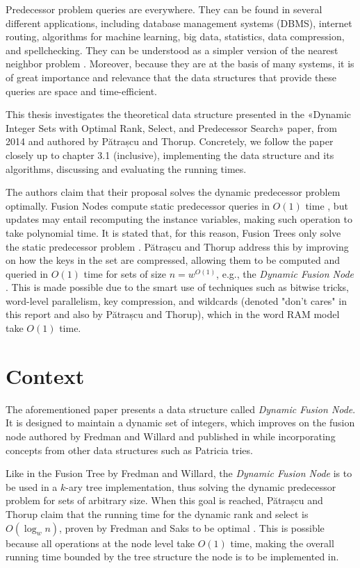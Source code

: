 Predecessor problem queries are everywhere. They can be found in several different applications, including database management systems (DBMS), internet routing, algorithms for machine learning, big data, statistics, data compression, and spellchecking. They can be understood as a simpler version of the nearest neighbor problem \cite{bille2020massive}. Moreover, because they are at the basis of many systems, it is of great importance and relevance that the data structures that provide these queries are space and time-efficient.

This thesis investigates the theoretical data structure presented in the «Dynamic Integer Sets with Optimal Rank, Select, and Predecessor Search» paper, from 2014 and authored by Pătrașcu and Thorup. Concretely, we follow the paper closely up to chapter 3.1 (inclusive), implementing the data structure and its algorithms, discussing and evaluating the running times.

The authors claim that their proposal solves the dynamic predecessor problem optimally.
Fusion Nodes compute static predecessor queries in $O(1)$ time \cite{fredman1993surpassing}, but updates may entail recomputing the instance variables, making such operation to take polynomial time.
It is stated that, for this reason, Fusion Trees only solve the static predecessor problem \cite{nelsonjelanilec2}.
Pătrașcu and Thorup address this by improving on how the keys in the set are compressed, allowing them to be computed and queried in $O(1)$ time for sets of size $n = w^{O(1)}$, e.g., the \textit{Dynamic Fusion Node} \cite{patrascu2014dynamic}.
This is made possible due to the smart use of techniques such as bitwise tricks, word-level parallelism, key compression, and wildcards (denoted "don't cares" in this report and also by Pătrașcu and Thorup), which in the word RAM model take $O(1)$ time.

\section{Context}

The aforementioned paper presents a data structure called \textit{Dynamic Fusion Node}. It is designed to maintain a dynamic set of integers, which improves on the fusion node authored by Fredman and Willard and published in \cite{fredman1993surpassing} while incorporating concepts from other data structures such as Patricia tries.

Like in the Fusion Tree by Fredman and Willard, the \textit{Dynamic Fusion Node} is to be used in a $k$-ary tree implementation, thus solving the dynamic predecessor problem for sets of arbitrary size. When this goal is reached, Pătrașcu and Thorup claim that the running time for the dynamic rank and select is $O(\log_w n)$, proven by Fredman and Saks to be optimal \cite{fredman1989cell}. This is possible because all operations at the node level take $O(1)$ time, making the overall running time bounded by the tree structure the node is to be implemented in.

